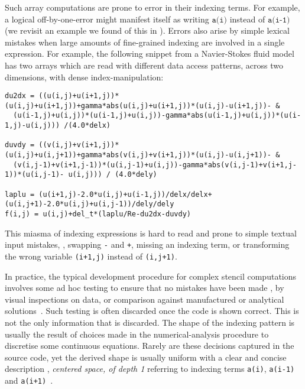 Such array computations are prone to error in their indexing
terms. For example, a logical off-by-one-error might manifest itself
as writing $\texttt{a(i)}$ instead of $\texttt{a(i-1)}$ (we revisit an
example we found of this in ).
Errors also arise by simple lexical mistakes when large amounts of
fine-grained indexing are involved in a single expression. For
example, the following snippet from a Navier-Stokes
fluid model~\cite{griebel1997numerical} has two arrays which are
read with different data access patterns, across two dimensions, with
dense index-manipulation:
\begin{verbatim}
du2dx = ((u(i,j)+u(i+1,j))*(u(i,j)+u(i+1,j))+gamma*abs(u(i,j)+u(i+1,j))*(u(i,j)-u(i+1,j))- &
  (u(i-1,j)+u(i,j))*(u(i-1,j)+u(i,j))-gamma*abs(u(i-1,j)+u(i,j))*(u(i-1,j)-u(i,j))) /(4.0*delx)

duvdy = ((v(i,j)+v(i+1,j))*(u(i,j)+u(i,j+1))+gamma*abs(v(i,j)+v(i+1,j))*(u(i,j)-u(i,j+1))- &
  (v(i,j-1)+v(i+1,j-1))*(u(i,j-1)+u(i,j))-gamma*abs(v(i,j-1)+v(i+1,j-1))*(u(i,j-1)- u(i,j))) / (4.0*dely)

laplu = (u(i+1,j)-2.0*u(i,j)+u(i-1,j))/delx/delx+(u(i,j+1)-2.0*u(i,j)+u(i,j-1))/dely/dely
f(i,j) = u(i,j)+del_t*(laplu/Re-du2dx-duvdy)
\end{verbatim}
%
This miasma of indexing expressions is hard to read and
prone to simple textual input mistakes, \eg{}, swapping \texttt{-} and
\texttt{+}, missing an indexing term, or transforming the wrong
variable \eg{} \texttt{(i+1,j)} instead of \texttt{(i,j+1)}.

In practice, the typical development procedure for complex stencil
computations involves some ad hoc testing to ensure that no
mistakes have been made \eg{}, by visual inspections on data,
or comparison against manufactured or analytical
solutions~\cite{farrell2010automated}. Such testing is often
discarded once the code is shown correct. This is not the only
information that is discarded. The shape of the indexing pattern
is usually the result of choices made in the numerical-analysis
procedure to discretise some continuous equations. Rarely are these decisions captured in the source code,
yet the derived shape is usually uniform with a
clear and concise description \eg{},
\emph{centered space, of depth 1} referring to indexing
terms \texttt{a(i)}, \texttt{a(i-1)} and
\texttt{a(i+1)}~\cite{recktenwald2004finite}.

